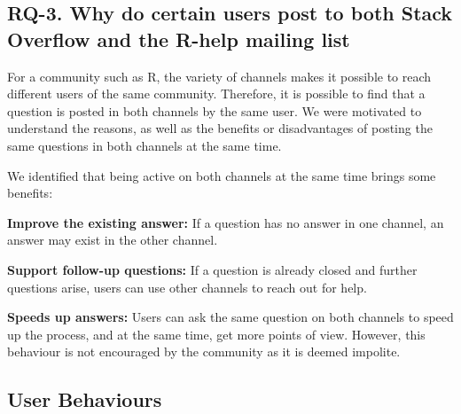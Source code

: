 \subsection{RQ-3. Why do certain users post to both Stack Overflow and the R-help mailing list}


    For a community such as R, the variety of channels makes it possible to reach different users of the same community.
    Therefore, it is possible to find that a question is posted in both channels by the same user.
    We were motivated to understand the reasons, as well as the benefits or disadvantages of posting the same questions in both channels at the same time.

    We identified that being active on both channels at the same time brings some benefits:
    \begin{packed_enum}
        \item \textbf{Improve the existing answer:} If a question has no answer in one channel, an answer may exist in the other channel.
        \item \textbf{Support follow-up questions:} If a question is already closed and further questions arise, users can use other channels to reach out for help.
        \item \textbf{Speeds up answers:} Users can ask the same question on both channels to speed up the process, and at the same time, get more points of view. However, this behaviour is not encouraged by the community as it is deemed impolite.
    \end{packed_enum}

\subsection{User Behaviours}
\label{sec:userbeh}

